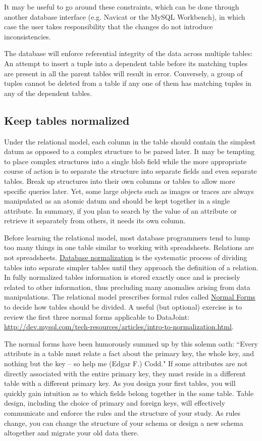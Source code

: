 \documentclass[10pt]{article}
\begin{document}
It may be useful to go around these constraints, which can be done through another database interface (e.g. Navicat or the MySQL Workbench), in which case the user takes responsibility that the changes do not introduce inconsistencies.

The database will enforce referential integrity of the data across multiple tables:  An attempt to insert a tuple into a dependent table before its matching tuples are present in all the parent tables will result in error.  Conversely, a group of tuples cannot be deleted from a table if any one of them has matching tuples in any of the dependent tables.


\subsection{Keep tables normalized}
Under the relational model, each column in the table should contain the simplest datum as opposed to a complex structure to be parsed later.  It may be tempting to place complex structures into a single blob field while the more appropriate course of action is to separate the structure into separate fields and even separate tables.   Break up structures into their own columns or tables to allow more specific queries later.  Yet, some large objects such as  images or traces are always manipulated as an atomic datum and should be kept together in a single attribute.  In summary, if you plan to search by the value of an attribute or retrieve it separately from others, it needs its own column.

Before learning the relational model, most database programmers tend to lump too many things in one table similar to working with spreadsheets.  Relations are not spreadsheets.  \href{http://en.wikipedia.org/wiki/Database_normalization}{Database normalization} is the systematic process of dividing tables into separate simpler tables until they approach the definition of a relation. In fully normalized tables information is stored exactly once and is precisely related to other information, thus precluding many anomalies arising from data manipulations.  The relational model prescribes formal rules called \href{http://en.wikipedia.org/wiki/Database_normalization}{Normal Forms} to decide how tables should be divided.  A useful (but optional) exercise is to review the first three normal forms applicable to DataJoint: \url{http://dev.mysql.com/tech-resources/articles/intro-to-normalization.html}.

The normal forms have been humorously summed up by this solemn oath: ``Every attribute in a table must relate a fact about the primary key, the whole key, and nothing but the key -- so help me (Edgar F.) Codd."  If some attributes are not directly associated with the entire primary key, they must reside in a different table with a different primary key.  As you design your first tables, you will quickly gain intuition as to which fields belong together in the same table.  Table design, including the choice of primary and foreign keys, will effectively communicate and enforce the rules and the structure of your study.  As rules change, you can change the structure of your schema or design a new schema altogether and migrate your old data there.
\end{document}

